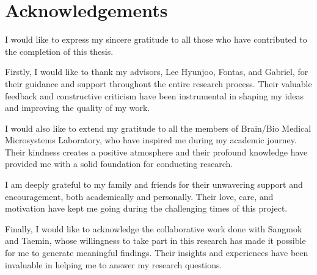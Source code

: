 \thispagestyle{main}
\chapter*{Acknowledgements}
I would like to express my sincere gratitude to all those who have contributed to the completion of this thesis.

Firstly, I would like to thank my advisors, Lee Hyunjoo, Fontas, and Gabriel, for their guidance and support throughout the entire research process. Their valuable feedback and constructive criticism have been instrumental in shaping my ideas and improving the quality of my work.

I would also like to extend my gratitude to all the members of Brain/Bio Medical Microsystems Laboratory, who have inspired me during my academic journey. Their kindness creates a positive atmosphere and their profound knowledge have provided me with a solid foundation for conducting research.

I am deeply grateful to my family and friends for their unwavering support and encouragement, both academically and personally. Their love, care, and motivation have kept me going during the challenging times of this project.

Finally, I would like to acknowledge the collaborative work done with Sangmok and Taemin, whose willingness to take part in this research has made it possible for me to generate meaningful findings. Their insights and experiences have been invaluable in helping me to answer my research questions.
